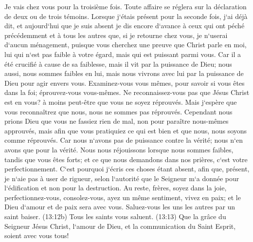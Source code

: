 \verse Je vais chez vous pour la troisième fois. Toute affaire se réglera sur la déclaration de deux ou de trois témoins. 
\verse Lorsque j`étais présent pour la seconde fois, j`ai déjà dit, et aujourd`hui que je suis absent je dis encore d`avance à ceux qui ont péché précédemment et à tous les autres que, si je retourne chez vous, je n`userai d`aucun ménagement, 
\verse puisque vous cherchez une preuve que Christ parle en moi, lui qui n`est pas faible à votre égard, mais qui est puissant parmi vous. 
\verse Car il a été crucifié à cause de sa faiblesse, mais il vit par la puissance de Dieu; nous aussi, nous sommes faibles en lui, mais nous vivrons avec lui par la puissance de Dieu pour agir envers vous. 
\verse Examinez-vous vous mêmes, pour savoir si vous êtes dans la foi; éprouvez-vous vous-mêmes. Ne reconnaissez-vous pas que Jésus Christ est en vous? à moins peut-être que vous ne soyez réprouvés. 
\verse Mais j`espère que vous reconnaîtrez que nous, nous ne sommes pas réprouvés. 
\verse Cependant nous prions Dieu que vous ne fassiez rien de mal, non pour paraître nous-mêmes approuvés, mais afin que vous pratiquiez ce qui est bien et que nous, nous soyons comme réprouvés. 
\verse Car nous n`avons pas de puissance contre la vérité; nous n`en avons que pour la vérité. 
\verse Nous nous réjouissons lorsque nous sommes faibles, tandis que vous êtes forts; et ce que nous demandons dans nos prières, c`est votre perfectionnement. 
\verse C`est pourquoi j`écris ces choses étant absent, afin que, présent, je n`aie pas à user de rigueur, selon l`autorité que le Seigneur m`a donnée pour l`édification et non pour la destruction. 
\verse Au reste, frères, soyez dans la joie, perfectionnez-vous, consolez-vous, ayez un même sentiment, vivez en paix; et le Dieu d`amour et de paix sera avec vous. 
\verse Saluez-vous les uns les autres par un saint baiser. 
\verse (13:12b) Tous les saints vous saluent. 
\verse (13:13) Que la grâce du Seigneur Jésus Christ, l`amour de Dieu, et la communication du Saint Esprit, soient avec vous tous! 
